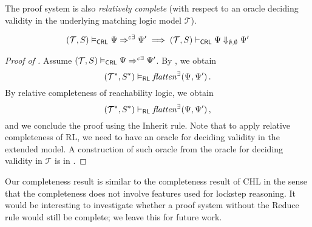 



The proof system is also \emph{relatively complete} (with respect to an oracle deciding validity
in the underlying matching logic model $\mathcal{T}$).
\begin{theorem}\label{thm:relativeCompleteness}
  \begin{equation*}
      (\mathcal{T}, S) \vDash_{\mathsf{CRL}} \Psi \Rightarrow^{c\exists} \Psi^\prime \implies
      (\mathcal{T}, S) \vdash_{\mathsf{CRL}} \Psi \Downarrow_{\emptyset,\emptyset} \Psi^\prime
  \end{equation*}
  \end{theorem}
  \begin{proof}[Proof of ]
  Assume $(\mathcal{T}, S) \vDash_{\mathsf{CRL}} \Psi \Rightarrow^{c\exists} \Psi^\prime$.
  By , 
  we obtain
  \begin{equation*}
    (\mathcal{T}^*, S^*) \vDash_{\mathsf{RL}}
    \mathit{flatten}^\exists(\Psi, \Psi^\prime) \, .
  \end{equation*}
  By relative completeness of reachability logic, we obtain
  \begin{equation*}
    (\mathcal{T}^*, S^*) \vdash_{\mathsf{RL}}
    \mathit{flatten}^\exists(\Psi, \Psi^\prime) \, ,
  \end{equation*}
  and we conclude the proof using the Inherit rule.
  Note that to apply relative completeness of RL, we need to have an oracle for deciding validity in the extended model.
  A construction of such oracle from the oracle for deciding validity in $\mathcal{T}$ is in .
  \end{proof}
Our completeness result is similar to the completeness result of CHL in the sense that the completeness
does not involve features used for lockstep reasoning.
It would be interesting to investigate whether a proof system without the Reduce rule would still be complete;
we leave this for future work.

